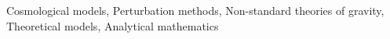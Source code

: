 \documentclass[twocolumn]{aastex631}
\begin{document}
Cosmological models, Perturbation methods, Non-standard theories of gravity, Theoretical models, Analytical mathematics
\end{document}
